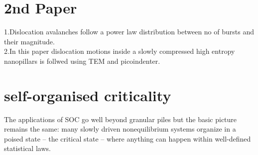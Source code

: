 \documentclass[12pt]{article}
\begin{document}
\section{2nd Paper}
1.\indent Dislocation avalanches follow a power law distribution between no of bursts and their magnitude.\\
2.\indent In this paper dislocation motions inside a slowly compressed high entropy nanopillars is follwed using TEM and picoindenter.
\section{self-organised criticality}
\indent The applications of SOC go well beyond granular piles but the basic picture remains the same: many slowly driven nonequilibrium systems organize in a poised state -- the critical state -- where anything can happen within well-defined statistical laws.
\end{document}
